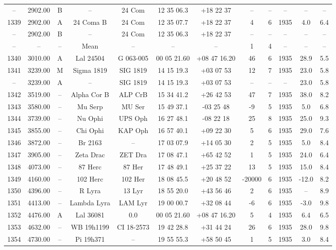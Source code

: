 \begin{table}
\begin{tabular}{cccccccccccc}
-- & 2902.00 & B & -- & 24 Com & 12 35 06.3 & +18 22 37 & -- & -- & -- & -- & -- \\
1339 & 2902.00 & A & 24 Coma B & 24 Com & 12 35 07.7 & +18 22 37 & 4 & 6 & 1935 & 4.0 & 6.4 \\
-- & 2902.00 & B & -- & 24 Com & 12 35 06.3 & +18 22 37 & -- & -- & -- & -- & -- \\
-- & -- & -- & Mean & -- & -- & -- & 1 & 4 & -- & -- & -- \\
1340 & 3010.00 & A & Lal 24504 & G 063-005 & 00 05 21.60 & +08 47 16.20 & 46 & 6 & 1935 & 28.9 & 5.5 \\
1341 & 3239.00 & M & Sigma 1819 & SIG 1819 & 14 15 19.3 & +03 07 53 & 12 & 7 & 1935 & 23.0 & 5.8 \\
-- & 3239.00 & A & -- & SIG 1819 & 14 15 19.3 & +03 07 53 & -- & -- & -- & 23.0 & 5.8 \\
1342 & 3519.00 & -- & Alpha Cor B & ALP CrB & 15 34 41.2 & +26 42 53 & 47 & 7 & 1935 & 38.0 & 8.2 \\
1343 & 3580.00 & -- & Mu Serp & MU Ser & 15 49 37.1 & -03 25 48 & -9 & 5 & 1935 & 5.0 & 6.8 \\
1344 & 3739.00 & -- & Nu Ophi & UPS Oph & 16 27 48.1 & -08 22 18 & 25 & 8 & 1935 & 25.0 & 9.3 \\
1345 & 3855.00 & -- & Chi Ophi & KAP Oph & 16 57 40.1 & +09 22 30 & 5 & 6 & 1935 & 29.0 & 7.6 \\
1346 & 3872.00 & -- & Br 2163 & -- & 17 03 07.9 & +14 05 30 & 2 & 5 & 1935 & 5.0 & 8.4 \\
1347 & 3905.00 & -- & Zeta Drac & ZET Dra & 17 08 47.1 & +65 42 52 & 1 & 5 & 1935 & 24.0 & 6.4 \\
1348 & 4073.00 & -- & 87 Herc & 87 Her & 17 48 49.1 & +25 37 22 & 13 & 5 & 1935 & 15.0 & 8.4 \\
1349 & 4160.00 & -- & 102 Herc & 102 Her & 18 08 45.5 & +20 48 52 & -20000 & 6 & 1935 & -12.0 & 8.2 \\
1350 & 4396.00 & -- & R Lyra & 13 Lyr & 18 55 20.0 & +43 56 46 & 2 & 6 & 1935 & -- & 8.9 \\
1351 & 4413.00 & -- & Lambda Lyra & LAM Lyr & 19 00 00.7 & +32 08 44 & -6 & 6 & 1935 & -3.0 & 9.8 \\
1352 & 4476.00 & A & Lal 36081 & 0.0 & 00 05 21.60 & +08 47 16.20 & 5 & 4 & 1935 & 6.4 & 6.5 \\
1353 & 4632.00 & -- & WB 19h1199 & CI 18-2573 & 19 42 28.8 & +31 44 24 & 26 & 6 & 1935 & 28.0 & 9.8 \\
1354 & 4730.00 & -- & Pi 19h371 & -- & 19 55 55.3 & +58 50 45 & 1 & 5 & 1935 & 3.0 & 8.4 \\

\end{tabular}
\end{table}
